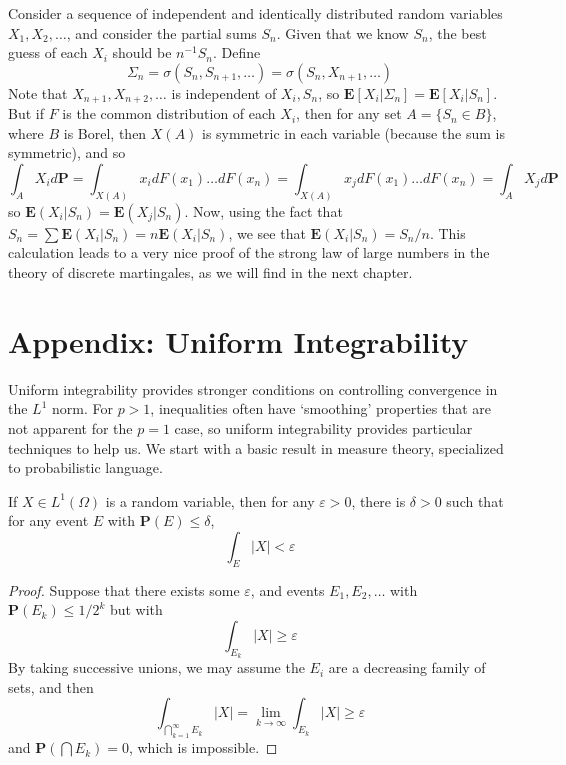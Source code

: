 \begin{example}
    Consider a sequence of independent and identically distributed random variables $X_1, X_2, \dots$, and consider the partial sums $S_n$. Given that we know $S_n$, the best guess of each $X_i$ should be $n^{-1} S_n$. Define
    \[ \Sigma_n = \sigma(S_n, S_{n+1}, \dots) = \sigma(S_n, X_{n+1}, \dots) \]
    Note that $X_{n+1}, X_{n+2}, \dots$ is independent of $X_i, S_n$, so $\mathbf{E}[X_i|\Sigma_n] = \mathbf{E}[X_i|S_n]$. But if $F$ is the common distribution of each $X_i$, then for any set $A = \{ S_n \in B \}$, where $B$ is Borel, then $X(A)$ is symmetric in each variable (because the sum is symmetric), and so
    \[ \int_A X_i d\mathbf{P} = \int_{X(A)} x_i dF(x_1) \dots dF(x_n) = \int_{X(A)} x_j dF(x_1) \dots dF(x_n) = \int_A X_j d\mathbf{P} \]
    so $\mathbf{E}(X_i|S_n) = \mathbf{E}(X_j|S_n)$. Now, using the fact that $S_n = \sum \mathbf{E}(X_i|S_n) = n\mathbf{E}(X_i|S_n)$, we see that $\mathbf{E}(X_i|S_n) = S_n/n$. This calculation leads to a very nice proof of the strong law of large numbers in the theory of discrete martingales, as we will find in the next chapter.
\end{example}


















\chapter{Appendix: Uniform Integrability}

Uniform integrability provides stronger conditions on controlling convergence in the $L^1$ norm. For $p > 1$, inequalities often have `smoothing' properties that are not apparent for the $p = 1$ case, so uniform integrability provides particular techniques to help us. We start with a basic result in measure theory, specialized to probabilistic language.

\begin{lemma}
    If $X \in L^1(\Omega)$ is a random variable, then for any $\varepsilon > 0$, there is $\delta > 0$ such that for any event $E$ with $\mathbf{P}(E) \leq \delta$,
    \[ \int_E |X| < \varepsilon \]
\end{lemma}
\begin{proof}
    Suppose that there exists some $\varepsilon$, and events $E_1, E_2, \dots$ with $\mathbf{P}(E_k) \leq 1/2^k$ but with
    \[ \int_{E_k} |X| \geq \varepsilon \]
    By taking successive unions, we may assume the $E_i$ are a decreasing family of sets, and then
    \[ \int_{\bigcap_{k = 1}^\infty E_k} |X| = \lim_{k \to \infty} \int_{E_k} |X| \geq \varepsilon \]
    and $\mathbf{P}(\bigcap E_k) = 0$, which is impossible.
\end{proof}

